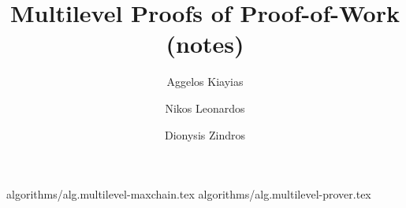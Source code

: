 \documentclass[11pt]{llncs}
\begin{document}
\title{
    Multilevel Proofs of Proof-of-Work (notes)
}
\author{
        Aggelos Kiayias \and
        Nikos Leonardos \and
        Dionysis Zindros
}
\maketitle
\noindent
\makebox[\linewidth]{\today}
% 
\thispagestyle{plain}

{algorithms/alg.multilevel-maxchain.tex}
{algorithms/alg.multilevel-prover.tex}

\end{document}
